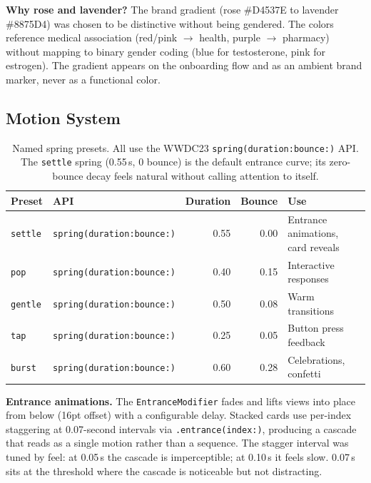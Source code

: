 \documentclass[11pt,a4paper]{article}
\newcommand{\code}[1]{\texttt{\small #1}}
\begin{document}
\textbf{Why rose and lavender?} The brand gradient (rose \#D4537E to
lavender \#8875D4) was chosen to be distinctive without being gendered.
The colors reference medical association (red/pink $\to$ health,
purple $\to$ pharmacy) without mapping to binary gender coding (blue for
testosterone, pink for estrogen). The gradient appears on the onboarding
flow and as an ambient brand marker, never as a functional color.

\subsection{Motion System}
\label{sec:motion}

\begin{table}[h]
\centering
\small
\begin{tabular}{@{}llrrl@{}}
\toprule
\textbf{Preset} & \textbf{API} & \textbf{Duration} & \textbf{Bounce} & \textbf{Use} \\
\midrule
\code{settle} & \code{spring(duration:bounce:)} & 0.55 & 0.00 & Entrance animations, card reveals \\
\code{pop}    & \code{spring(duration:bounce:)} & 0.40 & 0.15 & Interactive responses \\
\code{gentle} & \code{spring(duration:bounce:)} & 0.50 & 0.08 & Warm transitions \\
\code{tap}    & \code{spring(duration:bounce:)} & 0.25 & 0.05 & Button press feedback \\
\code{burst}  & \code{spring(duration:bounce:)} & 0.60 & 0.28 & Celebrations, confetti \\
\bottomrule
\end{tabular}
\caption{Named spring presets. All use the WWDC23 \code{spring(duration:bounce:)}
API. The \code{settle} spring (0.55\,s, 0 bounce) is the default entrance
curve; its zero-bounce decay feels natural without calling attention to
itself.}
\label{tab:springs}
\end{table}

\textbf{Entrance animations.} The \code{EntranceModifier} fades and lifts
views into place from below (16pt offset) with a configurable delay.
Stacked cards use per-index staggering at 0.07-second intervals via
\code{.entrance(index:)}, producing a cascade that reads as a single
motion rather than a sequence. The stagger interval was tuned by feel: at
0.05\,s the cascade is imperceptible; at 0.10\,s it feels slow. 0.07\,s
sits at the threshold where the cascade is noticeable but not
distracting.
\end{document}

